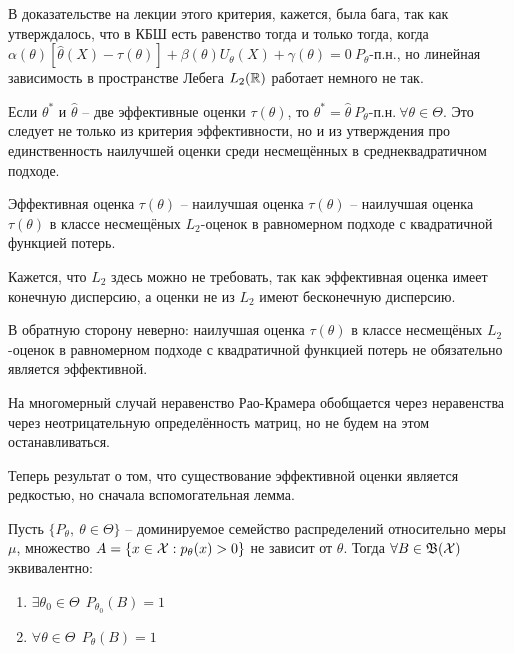 \begin{note}
    В доказательстве на лекции этого критерия, кажется, была бага, так как утверждалось, что в КБШ есть равенство тогда и только тогда, когда $\alpha(\theta) [\hat{\theta}(X) - \tau(\theta)] + \beta(\theta) U_\theta(X) + \gamma(\theta) = 0 \ P_\theta \text{-п.н.}$, но линейная зависимость в пространстве Лебега $L_2(\mathbb{R})$ работает немного не так.
\end{note}

\begin{corollary}
    Если $\theta^*$ и $\hat{\theta}$ -- две эффективные оценки $\tau(\theta)$, то $\theta^* = \hat{\theta} \ P_\theta \text{-п.н.} \ \forall \theta \in \Theta$. Это следует не только из критерия эффективности, но и из утверждения про единственность наилучшей оценки среди несмещённых в среднеквадратичном подходе.
\end{corollary}

\begin{note}
    Эффективная оценка $\tau(\theta)$ -- наилучшая оценка $\tau(\theta)$ -- наилучшая оценка $\tau(\theta)$ в классе несмещёных $L_2$-оценок в равномерном подходе с квадратичной функцией потерь.

    Кажется, что $L_2$ здесь можно не требовать, так как эффективная оценка имеет конечную дисперсию, а оценки не из $L_2$ имеют бесконечную дисперсию.

    В обратную сторону неверно: наилучшая оценка $\tau(\theta)$ в классе несмещёных $L_2$-оценок в равномерном подходе с квадратичной функцией потерь не обязательно является эффективной.
\end{note}

\begin{note}
    На многомерный случай неравенство Рао-Крамера обобщается через неравенства через неотрицательную определённость матриц, но не будем на этом останавливаться.
\end{note}

\begin{note}
    Теперь результат о том, что существование эффективной оценки является редкостью, но сначала вспомогательная лемма.
\end{note}

\begin{lemma}
     Пусть $\{P_\theta,\ \theta \in \Theta\}$ -- доминируемое семейство распределений относительно меры $\mu$, множество $A = \{x \in \mathcal{X} : p_\theta(x) > 0\}$ не зависит от $\theta$. Тогда $\forall B \in \mathfrak{B}(\mathcal{X})$ эквивалентно:
     \begin{enumerate}
         \item $\exists \theta_0 \in \Theta \ \ P_{\theta_0}(B) = 1$
         \item $\forall \theta \in \Theta \ \ P_\theta(B) = 1$
     \end{enumerate}
\end{lemma}

